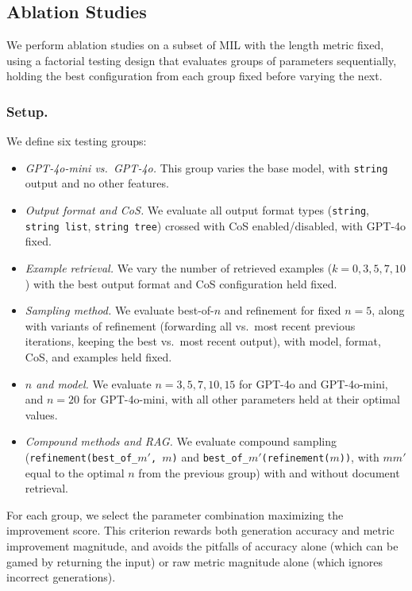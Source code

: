 \subsection{Ablation Studies}
\label{sssec:ablations}

We perform ablation studies on a subset of MIL with the length metric fixed, using a factorial testing design that evaluates groups of parameters sequentially, holding the best configuration from each group fixed before varying the next. 

\subsubsection{Setup.} We define six testing groups:
\begin{itemize}
    
\item \textit{GPT-4o-mini vs.\ GPT-4o.} This group varies the base model, with \texttt{string} output and no other features.

\item \textit{Output format and CoS.} We evaluate all output format types (\texttt{string}, \texttt{string list}, \texttt{string tree}) crossed with CoS enabled/disabled, with GPT-4o fixed.

\item \textit{Example retrieval.} We vary the number of retrieved examples ($k = 0, 3, 5, 7, 10$) with the best output format and CoS configuration held fixed.

\item \textit{Sampling method.} We evaluate best-of-$n$ and refinement for fixed $n=5$, along with variants of refinement (forwarding all vs.\ most recent previous iterations, keeping the best vs.\ most recent output), with model, format, CoS, and examples held fixed.

\item \textit{$n$ and model.} We evaluate $n = 3, 5, 7, 10, 15$ for GPT-4o and GPT-4o-mini, and $n=20$ for GPT-4o-mini, with all other parameters held at their optimal values.

\item \textit{Compound methods and RAG.} We evaluate compound sampling (\texttt{refinement(best\_of\_$m'$, $m$)} and \texttt{best\_of\_$m'$(refinement($m$))}, with $mm'$ equal to the optimal $n$ from the previous group) with and without document retrieval.
\end{itemize}

For each group, we select the parameter combination maximizing the improvement score. This criterion rewards both generation accuracy and metric improvement magnitude, and avoids the pitfalls of accuracy alone (which can be gamed by returning the input) or raw metric magnitude alone (which ignores incorrect generations).

